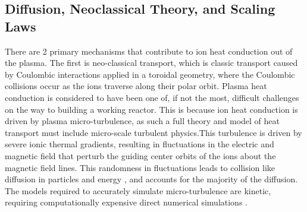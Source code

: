 \documentclass{article}
\begin{document}
\subsection{Diffusion, Neoclassical Theory, and Scaling Laws}
There are 2 primary mechanisms that contribute to ion heat conduction out of the plasma.
The first is neo-classical transport, which is classic transport caused by Coulombic interactions applied in a toroidal geometry, where the Coulombic collisions occur as the ions traverse along their polar orbit.
Plasma heat conduction is considered to have been one of, if not the most, difficult challenges on the way to building a working reactor. This is because ion heat conduction is driven by plasma micro-turbulence, as such a full theory and model of heat transport must include micro-scale turbulent physics.This turbulence is driven by severe ionic thermal gradients, resulting in fluctuations in the electric and magnetic field that perturb the guiding center orbits of the ions about the magnetic field lines. This randomness in fluctuations  leads to collision like diffusion in particles and energy \cite{J_Friedberg:1}, and accounts for the majority of the diffusion. The models required to accurately simulate micro-turbulence are kinetic, requiring computationally expensive direct numerical simulations .\\
\end{document}
